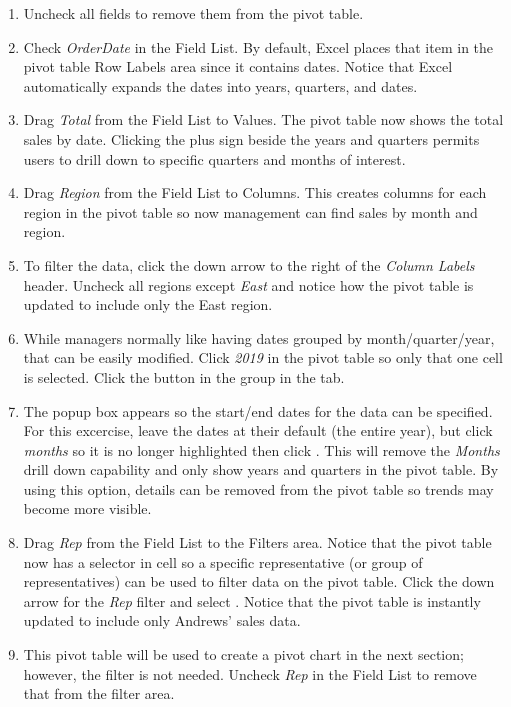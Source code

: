 \begin{enumerate}[resume]
	\item Uncheck all fields to remove them from the pivot table.
	\item Check \textit{OrderDate} in the Field List. By default, Excel places that item in the pivot table Row Labels area since it contains dates. Notice that Excel automatically expands the dates into years, quarters, and dates.
	\item Drag \textit{Total} from the Field List to Values. The pivot table now shows the total sales by date. Clicking the plus sign beside the years and quarters permits users to drill down to specific quarters and months of interest.
	\item Drag \textit{Region} from the Field List to Columns. This creates columns for each region in the pivot table so now management can find sales by month and region.
	\item To filter the data, click the down arrow to the right of the \textit{Column Labels} header. Uncheck all regions except \textit{East} and notice how the pivot table is updated to include only the East region.
	\item While managers normally like having dates grouped by month/quarter/year, that can be easily modified. Click \textit{2019} in the pivot table so only that one cell is selected. Click the  button in the  group in the  tab. 
	\item The  popup box appears so the start/end dates for the data can be specified. For this excercise, leave the dates at their default (the entire year), but click \textit{months} so it is no longer highlighted then click . This will remove the \textit{Months} drill down capability and only show years and quarters in the pivot table. By using this option, details can be removed from the pivot table so trends may become more visible.
	\item Drag \textit{Rep} from the Field List to the Filters area. Notice that the pivot table now has a selector in cell  so a specific representative (or group of representatives) can be used to filter data on the pivot table. Click the down arrow for the \textit{Rep} filter and select . Notice that the pivot table is instantly updated to include only Andrews' sales data.
	\item This pivot table will be used to create a pivot chart in the next section; however, the filter is not needed. Uncheck \textit{Rep} in the Field List to remove that from the filter area.
\end{enumerate}

